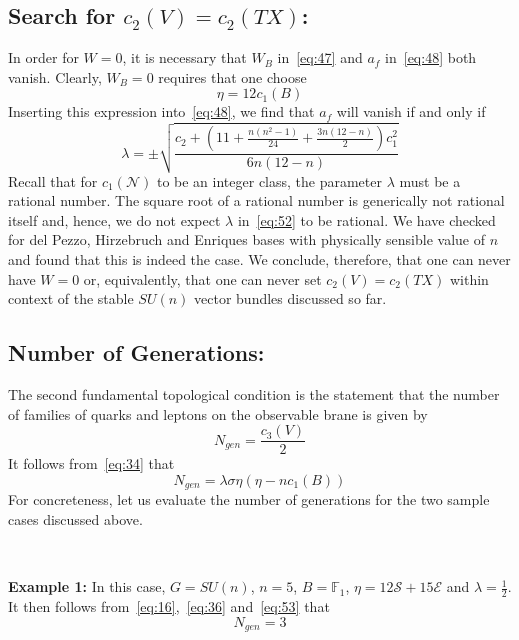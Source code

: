 \documentclass[a4paper,12pt]{article}
\numberwithin{equation}{section}
\def\cE{{\mathcal E}}
\def\cN{{\mathcal N}}
\def\cS{{\mathcal S}}
\theoremstyle{plain}
\begin{document}
\subsection*{Search for $c_{2}(V)=c_{2}(TX)$:}

In order for $W=0$, it is necessary that $W_{B}$ in~\eqref{eq:47} and
$a_{f}$ in~\eqref{eq:48} both vanish. Clearly, $W_{B}=0$ requires that
one choose 
\begin{equation}
\eta=12c_{1}(B)
\label{eq:51}
\end{equation}
Inserting this expression into~\eqref{eq:48}, we find that $a_{f}$
will vanish if 
and only if
\begin{equation}
\lambda=\pm\sqrt{\frac{c_{2}+(11+\frac{n(n^{2}-1)}{24}
+\frac{3n(12-n)}{2})c_{1}^{2}}{6n(12-n)}}
\label{eq:52}
\end{equation}
Recall that for $c_{1}(\cN)$ to be an integer class, the parameter $\lambda$ must
be a rational number. The square root of a rational number is generically not
rational itself and, hence, we do not expect $\lambda$ in~\eqref{eq:52} to be
rational. We have checked for del Pezzo, Hirzebruch and Enriques bases with
physically sensible value of $n$ and found that this is indeed the case. We
conclude, therefore, that one can never have $W=0$ or, equivalently,
that one can never set $c_{2}(V)=c_{2}(TX)$ within context of the 
stable $SU(n)$ vector bundles discussed so far.

\subsection*{Number of Generations:}

The second fundamental topological condition is the statement that the number
of families of quarks and leptons on the observable brane is given by
\[
N_{gen}=\frac{c_{3}(V)}{2}
\]
It follows from~\eqref{eq:34} that
\begin{equation}
N_{gen}=\lambda \sigma \eta( \eta-nc_{1}(B))
\label{eq:53}
\end{equation}
For concreteness, let us evaluate the number of generations for the two 
sample cases discussed above.


\smallskip

\

\noindent
{\bf Example 1:} \quad 
In this case, $G=SU(n)$, $n=5$, $B={\mathbb F}_{1}$, $\eta=12\cS+15\cE$ and
$\lambda=\frac{1}{2}$. It then follows
from~\eqref{eq:16},~\eqref{eq:36} and~\eqref{eq:53} that 
\begin{equation}
N_{gen}=3
\label{eq:54}
\end{equation}
\end{document}

